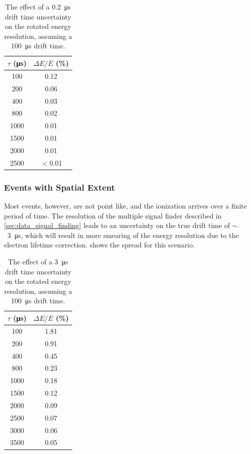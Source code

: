 \documentclass[herrin-thesis.tex]{subfiles}
\begin{document}
\begin{table}[tbp]
\centering
\caption[Effect of drift time uncertainty on resolution for ideal events]{The effect of a \SI{0.2}{\micro\second} drift time uncertainty on the rotated energy resolution, assuming a \SI{100}{\micro\second} drift time.}
\label{tab:el_res_dt_ideal}
\begin{tabular}{c c}\toprule
	\(\tau\) (\si{\micro\second})	&	\(\Delta E / E\) (\%) 	\\\midrule
	100					&	0.12				\\
	200					&	0.06				\\
	400					&	0.03				\\
	800					&	0.02				\\
	1000					&	0.01				\\
	1500					&	0.01				\\
	2000					&	0.01				\\
	2500					&	\(<\)0.01			\\\bottomrule
\end{tabular}
\end{table}

\subsubsection{Events with Spatial Extent}
Most events, however, are not point like, and the ionization arrives over a finite period of time. The resolution of the multiple signal finder described in \cref{sec:data_signal_finding} leads to an uncertainty on the true drift time of \(\sim\)~\SI{3}{\micro\second}, which will result in more smearing of the energy resolution due to the electron lifetime correction.  shows the spread for this scenario.

\begin{table}[tbp]
\centering
\caption[Effect of drift time uncertainty on resolution for realistic events]{The effect of a \SI{3}{\micro\second} drift time uncertainty on the rotated energy resolution, assuming a \SI{100}{\micro\second} drift time.}
\label{tab:el_res_dt}
\begin{tabular}{c c}\toprule
	\(\tau\) (\si{\micro\second})	&	\(\Delta E / E\) (\%) 	\\\midrule
	100					&	1.81				\\
	200					&	0.91				\\
	400					&	0.45				\\
	800					&	0.23				\\
	1000					&	0.18				\\
	1500					&	0.12				\\
	2000					&	0.09				\\
	2500					&	0.07				\\
	3000					&	0.06				\\
	3500					&	0.05				\\\bottomrule
\end{tabular}
\end{table}
\end{document}
